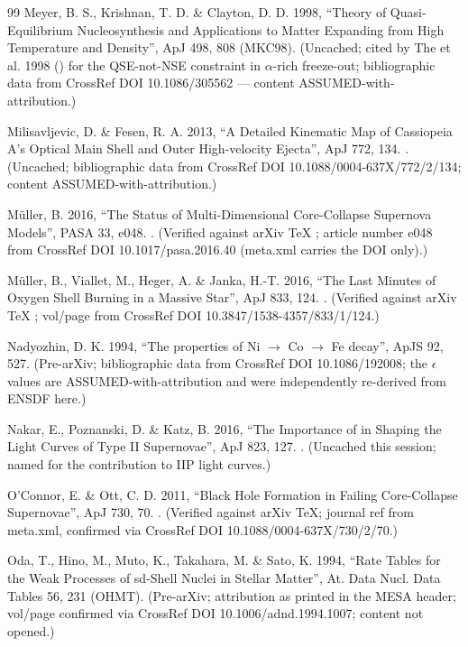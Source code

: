 \begin{thebibliography}{99}
Meyer, B. S., Krishnan, T. D. \& Clayton, D. D. 1998, ``Theory of Quasi-Equilibrium Nucleosynthesis and Applications to Matter Expanding from High Temperature and Density'', ApJ 498, 808 (MKC98). (Uncached; cited by The et al. 1998 () for the QSE-not-NSE constraint in $\alpha$-rich freeze-out; bibliographic data from CrossRef DOI 10.1086/305562 --- content ASSUMED-with-attribution.)

Milisavljevic, D. \& Fesen, R. A. 2013, ``A Detailed Kinematic Map of Cassiopeia A's Optical Main Shell and Outer High-velocity Ejecta'', ApJ 772, 134. . (Uncached; bibliographic data from CrossRef DOI 10.1088/0004-637X/772/2/134; content ASSUMED-with-attribution.)

M\"uller, B. 2016, ``The Status of Multi-Dimensional Core-Collapse Supernova Models'', PASA 33, e048. . (Verified against arXiv TeX ; article number e048 from CrossRef DOI 10.1017/pasa.2016.40 (meta.xml carries the DOI only).)

M\"uller, B., Viallet, M., Heger, A. \& Janka, H.-T. 2016, ``The Last Minutes of Oxygen Shell Burning in a Massive Star'', ApJ 833, 124. . (Verified against arXiv TeX ; vol/page from CrossRef DOI 10.3847/1538-4357/833/1/124.)

Nadyozhin, D. K. 1994, ``The properties of Ni $\to$ Co $\to$ Fe decay'', ApJS 92, 527. (Pre-arXiv; bibliographic data from CrossRef DOI 10.1086/192008; the $\epsilon$ values are ASSUMED-with-attribution and were independently re-derived from ENSDF here.)

Nakar, E., Poznanski, D. \& Katz, B. 2016, ``The Importance of  in Shaping the Light Curves of Type II Supernovae'', ApJ 823, 127. . (Uncached this session; named for the  contribution to IIP light curves.)

O'Connor, E. \& Ott, C. D. 2011, ``Black Hole Formation in Failing Core-Collapse Supernovae'', ApJ 730, 70. . (Verified against arXiv TeX; journal ref from meta.xml, confirmed via CrossRef DOI 10.1088/0004-637X/730/2/70.)

Oda, T., Hino, M., Muto, K., Takahara, M. \& Sato, K. 1994, ``Rate Tables for the Weak Processes of sd-Shell Nuclei in Stellar Matter'', At. Data Nucl. Data Tables 56, 231 (OHMT). (Pre-arXiv; attribution as printed in the MESA  header; vol/page confirmed via CrossRef DOI 10.1006/adnd.1994.1007; content not opened.)


\end{thebibliography}

